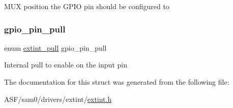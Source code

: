 M\+UX position the G\+P\+IO pin should be configured to \mbox{\label{structextint__nmi__conf_a2722ba2735f217f3c7e30f2e4135c134}} 
\subsubsection{\texorpdfstring{gpio\_pin\_pull}{gpio\_pin\_pull}}
{\footnotesize\ttfamily enum \mbox{\hyperlink{group__asfdoc__sam0__extint__group_ga01b49a5a87ca71359c5a9bc2ee02853e}{extint\+\_\+pull}} gpio\+\_\+pin\+\_\+pull}

Internal pull to enable on the input pin 

The documentation for this struct was generated from the following file\+:\begin{DoxyCompactItemize}
\item 
A\+S\+F/sam0/drivers/extint/\mbox{\hyperlink{extint_8h}{extint.\+h}}\end{DoxyCompactItemize}
